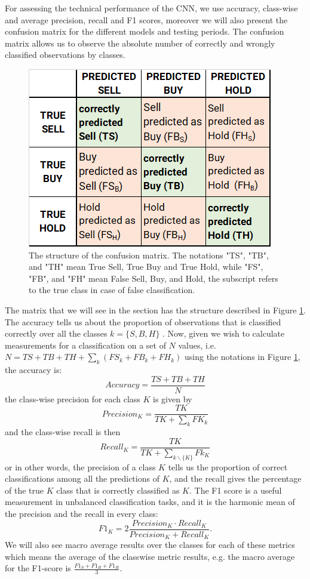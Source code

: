 \documentclass[12pt, a4paper]{article}
\begin{document}
For assessing the technical performance of the CNN, we use accuracy, class-wise and average precision, recall and F1 scores, moreover we will also present the confusion matrix for the different models and testing periods. 
The confusion matrix allows us to observe the absolute number of correctly and wrongly classified observations by classes. 
\begin{figure}[ht]
    \centering
    \includegraphics[width=.5\textwidth]{images/Confusion_matrix.png}
    \caption{The structure of the confusion matrix. The notations "TS", "TB", and "TH" mean True Sell, True Buy and True Hold, while "FS", "FB", and "FH" mean False Sell, Buy, and Hold, the subscript refers to the true class in case of false classification.}
    \label{fig:cmdef}
\end{figure}
The matrix that we will see in the section  has the structure described in Figure \ref{fig:cmdef}.
The accuracy tells us about the proportion of observations that is classified correctly over all the classes $k = \{S, B, H\}$ . Now, given we wish to calculate measurements for a classification on a set of $N$ values, i.e. $N = TS + TB + TH + \sum_k \left(FS_k + FB_k + FH_k\right)$ using the notations in Figure \ref{fig:cmdef}, the accuracy is:
\begin{equation}
    \label{eq:acc}
    Accuracy = \frac{TS + TB + TH}{N}
\end{equation}
the class-wise precision for each class $K$ is given by
\begin{equation}
    \label{eq:pr}
    Precision_K = \frac{TK}{TK +  \sum_k FK_k}
\end{equation}
and the class-wise recall is then 
\begin{equation}
    \label{eq:rec}
    Recall_K = \frac{TK}{TK +  \sum_{k  \smallsetminus \{K\}} Fk_K}
\end{equation}
or in other words, the precision of a class $K$ tells us the proportion of correct classifications among all the predictions of $K$, and the recall gives the percentage of the true $K$ class that is correctly classified as $K$. The F1 score is a useful measurement in unbalanced classification tasks, and it is the harmonic mean of the precision and the recall in every class:
\begin{equation}
    \label{eq:f1}
    F1_K = 2 \frac{Precision_K \cdot Recall_K}{Precision_K + Recall_K}.
\end{equation}
We will also see macro average results over the classes for each of these metrics which means the average of the classwise metric results, e.g. the macro average for the F1-score is $\frac{F1_S + F1_B + F1_H}{3}$.
\end{document}
